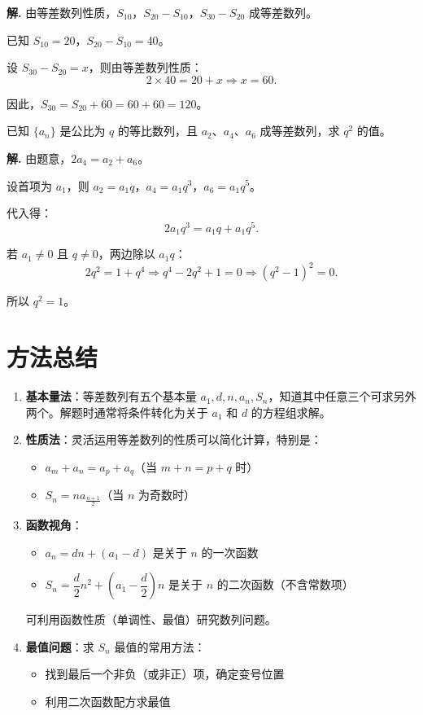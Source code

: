 \documentclass[11pt]{ctexrep}
\begin{document}
\textbf{解.} 由等差数列性质，$S_{10}$，$S_{20} - S_{10}$，$S_{30} - S_{20}$ 成等差数列。

已知 $S_{10} = 20$，$S_{20} - S_{10} = 40$。

设 $S_{30} - S_{20} = x$，则由等差数列性质：
\[
    2 \times 40 = 20 + x \Rightarrow x = 60.
\]

因此，$S_{30} = S_{20} + 60 = 60 + 60 = 120$。

\begin{realexam}[2023 静安二模改编]
    已知 $\{a_n\}$ 是公比为 $q$ 的等比数列，且 $a_2$、$a_4$、$a_6$ 成等差数列，求 $q^2$ 的值。
\end{realexam}

\textbf{解.} 由题意，$2a_4 = a_2 + a_6$。

设首项为 $a_1$，则 $a_2 = a_1q$，$a_4 = a_1q^3$，$a_6 = a_1q^5$。

代入得：
\[
    2a_1q^3 = a_1q + a_1q^5.
\]

若 $a_1 \neq 0$ 且 $q \neq 0$，两边除以 $a_1q$：
\[
    2q^2 = 1 + q^4 \Rightarrow q^4 - 2q^2 + 1 = 0 \Rightarrow (q^2 - 1)^2 = 0.
\]

所以 $q^2 = 1$。

\section*{方法总结}

\begin{enumerate}
    \item \textbf{基本量法}：等差数列有五个基本量 $a_1, d, n, a_n, S_n$，知道其中任意三个可求另外两个。解题时通常将条件转化为关于 $a_1$ 和 $d$ 的方程组求解。
    
    \item \textbf{性质法}：灵活运用等差数列的性质可以简化计算，特别是：
    \begin{itemize}
        \item $a_m + a_n = a_p + a_q$（当 $m+n=p+q$ 时）
        \item $S_n = na_{\frac{n+1}{2}}$（当 $n$ 为奇数时）
    \end{itemize}
    
    \item \textbf{函数视角}：
    \begin{itemize}
        \item $a_n = dn + (a_1 - d)$ 是关于 $n$ 的一次函数
        \item $S_n = \dfrac{d}{2}n^2 + \left(a_1 - \dfrac{d}{2}\right)n$ 是关于 $n$ 的二次函数（不含常数项）
    \end{itemize}
    可利用函数性质（单调性、最值）研究数列问题。
    
    \item \textbf{最值问题}：求 $S_n$ 最值的常用方法：
    \begin{itemize}
        \item 找到最后一个非负（或非正）项，确定变号位置
        \item 利用二次函数配方求最值
    \end{itemize}
\end{enumerate}
\end{document}
